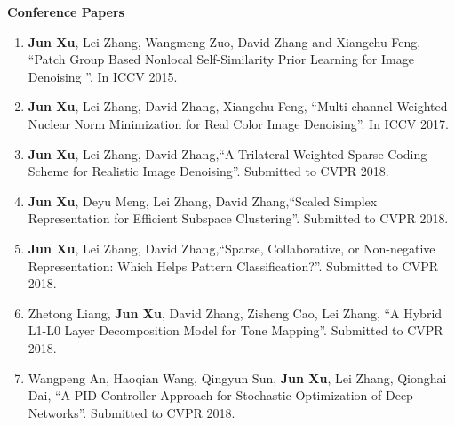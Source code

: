 \documentclass[12pt,oneside]{report}
\numberwithin{figure}{chapter}
\newenvironment{preliminary}%
{\pagestyle{plain}\pagenumbering{roman}}%
{\pagenumbering{arabic}}
\begin{document}
\begin{preliminary}
\begin{enumerate}
\end{enumerate}

\textbf{Conference Papers}
\begin{enumerate}
  \item \textbf{Jun Xu}, Lei Zhang, Wangmeng Zuo, David Zhang and Xiangchu Feng, ``Patch Group Based Nonlocal Self-Similarity Prior Learning for Image Denoising ''. In ICCV 2015.
  \item \textbf{Jun Xu}, Lei Zhang, David Zhang, Xiangchu Feng, ``Multi-channel Weighted Nuclear Norm Minimization for Real Color Image Denoising''. In ICCV 2017.
 \item \textbf{Jun Xu}, Lei Zhang, David Zhang,``A Trilateral Weighted Sparse Coding Scheme for Realistic Image Denoising''. Submitted to CVPR 2018.
 \item \textbf{Jun Xu}, Deyu Meng, Lei Zhang, David Zhang,``Scaled Simplex Representation for Efficient Subspace Clustering''. Submitted to CVPR 2018.
 \item \textbf{Jun Xu}, Lei Zhang, David Zhang,``Sparse, Collaborative, or Non-negative Representation: Which Helps Pattern Classification?''. Submitted to CVPR 2018.
 \item Zhetong Liang, \textbf{Jun Xu}, David Zhang, Zisheng Cao, Lei Zhang, ``A Hybrid L1-L0 Layer Decomposition Model for Tone Mapping''. Submitted to CVPR 2018.
 \item Wangpeng An, Haoqian  Wang, Qingyun  Sun, \textbf{Jun Xu}, Lei Zhang, Qionghai  Dai, ``A PID Controller Approach for Stochastic Optimization of Deep Networks''. Submitted to CVPR 2018.

\end{enumerate}

\newpage

\tableofcontents\newpage
\newpage
{}
\listoffigures
\newpage
{}
\listoftables
\cleardoublepage  %


\end{preliminary}



\makeatletter
\long{}
\makeatother
\end{document}
